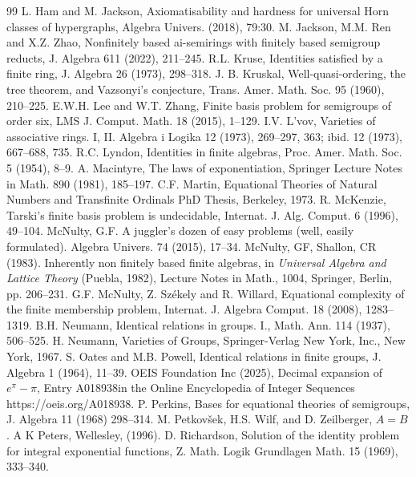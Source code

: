 \documentclass[eqnor,reqno]{amsart}
\theoremstyle{plain}
\theoremstyle{definition}
\begin{document}
\begin{thebibliography}{99}
 L. Ham and M. Jackson, Axiomatisability and hardness for universal Horn classes of hypergraphs, Algebra Univers. (2018), 79:30.
 M. Jackson, M.M. Ren and X.Z. Zhao, Nonfinitely based ai-semirings with finitely based
semigroup reducts, J. Algebra 611 (2022), 211--245.
 R.L. Kruse, 
Identities satisfied by a finite ring, J. Algebra 26 (1973), 298--318.
 J. B. Kruskal, Well-quasi-ordering, the tree theorem, and Vazsonyi's conjecture, Trans. Amer. Math. Soc. 95 (1960), 210--225.
 E.W.H. Lee and W.T. Zhang, Finite basis problem for semigroups of order six, LMS J. Comput. Math. 18 (2015), 1--129.
 I.V. L'vov, Varieties of associative rings. I, II. Algebra i Logika 12 (1973), 269--297, 363; ibid. 12 (1973), 667--688, 735.
 R.C. Lyndon, Identities in finite algebras, Proc. Amer. Math. Soc. 5 (1954), 8--9.
 A. Macintyre, The laws of exponentiation, Springer Lecture Notes in Math. 890 (1981), 185--197.
 C.F. Martin, Equational Theories of Natural Numbers and Transfinite Ordinals PhD Thesis, Berkeley, 1973.
 R. McKenzie, Tarski's finite basis problem is undecidable, Internat. J. Alg. Comput. 6 (1996), 49--104.
 McNulty, G.F.   A juggler's dozen of easy problems (well, easily formulated). {Algebra Univers.} 74 (2015), 17--34.
 McNulty, GF, Shallon,  CR (1983). Inherently non finitely based finite algebras, in \emph{Universal Algebra and
Lattice Theory} (Puebla, 1982), Lecture Notes in Math., 1004, Springer, Berlin, pp. 206--231.
 G.F. McNulty, Z. Sz\'ekely and R. Willard, Equational complexity of the finite membership problem, Internat. J. Algebra Comput. 18 (2008), 1283--1319.
 B.H. Neumann, Identical relations in groups. I., Math. Ann. 114 (1937), 506--525.
 H. Neumann, Varieties of Groups, Springer-Verlag New York, Inc., New York, 1967.
 S. Oates and M.B. Powell, Identical relations in finite groups, J. Algebra 1 (1964), 11--39.
 OEIS Foundation Inc (2025),
Decimal expansion of $e^\pi - \pi$, Entry A018938in the Online Encyclopedia of Integer Sequences https://oeis.org/A018938.
 P. Perkins, Bases for equational theories of semigroups, J. Algebra 11 (1968) 298--314.
 M. Petkov\v{s}ek, H.S. Wilf, and D. Zeilberger, $A = B$. A K Peters, Wellesley, (1996).
 D. Richardson,  Solution of the identity problem for integral exponential functions, Z. Math. Logik Grundlagen Math. 15 (1969), 333--340.

\end{thebibliography}
\end{document}
